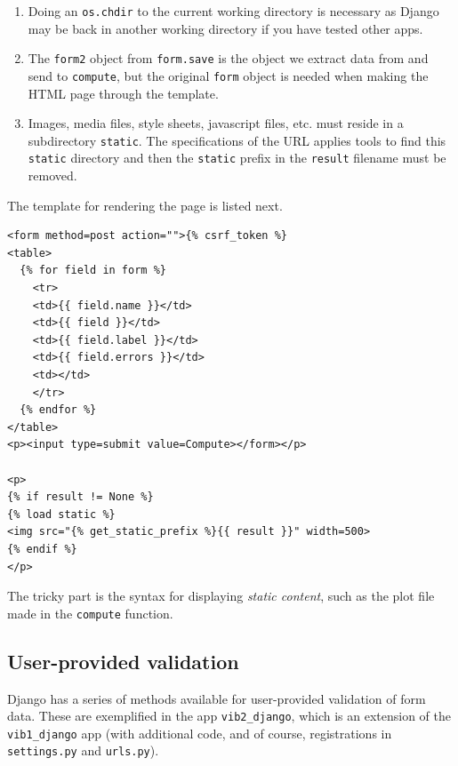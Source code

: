 \documentclass[%
oneside,                 %
final,                   %
10pt]{article}
\begin{document}
\begin{enumerate}
\item Doing an \Verb!os.chdir! to the current working directory is necessary
   as Django may be back in another working directory if you have
   tested other apps.

\item The \Verb!form2! object from \Verb!form.save! is the object we extract
   data from and send to \Verb!compute!, but the original \Verb!form!
   object is needed when making the HTML page through the template.

\item Images, media files, style sheets, javascript files, etc. must
   reside in a subdirectory \Verb!static!. The specifications of the
   URL applies tools to find this \Verb!static! directory and then
   the \Verb!static! prefix in the \Verb!result! filename must be removed.
\end{enumerate}

\noindent
The template for rendering the page is listed next.

\begin{Verbatim}[numbers=none,fontsize=\fontsize{9pt}{9pt},baselinestretch=0.85]
<form method=post action="">{% csrf_token %}
<table>
  {% for field in form %}
    <tr>
    <td>{{ field.name }}</td>
    <td>{{ field }}</td>
    <td>{{ field.label }}</td>
    <td>{{ field.errors }}</td>
    <td></td>
    </tr>
  {% endfor %}
</table>
<p><input type=submit value=Compute></form></p>

<p>
{% if result != None %}
{% load static %}
<img src="{% get_static_prefix %}{{ result }}" width=500>
{% endif %}
</p>
\end{Verbatim}
The tricky part is the syntax for displaying \emph{static content}, such as
the plot file made in the \Verb!compute! function.

\subsection{User-provided validation}



Django has a series of methods available for user-provided validation
of form data. These are exemplified in the app \Verb!vib2_django!, which
is an extension of the \Verb!vib1_django! app (with additional code, and
of course, registrations in \Verb!settings.py! and \Verb!urls.py!).

\end{document}
